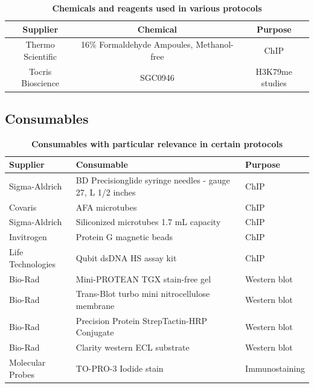 \documentclass[11pt,twoside,a4paper]{report}
\begin{document}
			\begin{table}[H]
       		\caption{\bf{Chemicals and reagents used in various protocols}}
        		\begin{center}
            		\begin{tabular}{c|c|c}
	               		Supplier & Chemical & Purpose\\
    		            \hline
    		            Thermo Scientific & 16\% Formaldehyde Ampoules, Methanol-free & ChIP\\
    		            Tocris Bioscience & SGC0946 & H3K79me studies\\
	            	\end{tabular}
    		    \end{center}
		    \end{table}
    
	    \subsection{Consumables}
	    \label{subsection:consumables}
			\begin{table}[H]
       			\caption{\bf{Consumables with particular relevance in certain protocols}}
        		\begin{center}
            		\begin{tabular}{p{2.9cm} | p{8.2cm} | p{2.2cm}}
	                	\textbf{Supplier} & \textbf{Consumable} &  \textbf{Purpose}\\
    		            \hline
    		            Sigma-Aldrich & BD Precisionglide syringe needles - gauge 27, L 1/2 inches & ChIP\\
    		            Covaris & AFA microtubes & ChIP\\
						Sigma-Aldrich & Siliconized microtubes 1.7 mL capacity & ChIP\\
        		        Invitrogen & Protein G magnetic beads & ChIP\\
        		        Life Technologies & Qubit dsDNA HS assay kit & ChIP\\
        		        Bio-Rad & Mini-PROTEAN TGX stain-free gel & Western blot\\
        		        Bio-Rad & Trans-Blot turbo mini nitrocellulose membrane & Western blot\\
						Bio-Rad & Precision Protein StrepTactin-HRP Conjugate & Western blot\\
        		        Bio-Rad & Clarity western ECL substrate & Western blot\\
        		        Molecular Probes & TO-PRO-3 Iodide stain & Immunostaining\\
	            	\end{tabular}
    		    \end{center}
		    \end{table}
    
\end{document}
